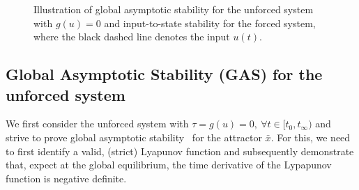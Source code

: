 
\begin{figure}[t]
    \centering
    \caption{Illustration of global asymptotic stability for the unforced system with $g(u)=0$ and input-to-state stability for the forced system, where the black dashed line denotes the input $u(t)$.}
    \label{fig:con:gas_iss_illustration}
\end{figure}

\subsection{Global Asymptotic Stability (GAS) for the unforced system} 
We first consider the unforced system with $\tau = g(u) = 0, \: \forall t \in [t_0, t_\infty)$ and strive to prove global asymptotic stability~\citep{khalil2002nonlinear} for the attractor $\bar{x}$.
For this, we need to first identify a valid, (strict) Lyapunov function and subsequently demonstrate that, expect at the global equilibrium, the time derivative of the Lypapunov function is negative definite.

